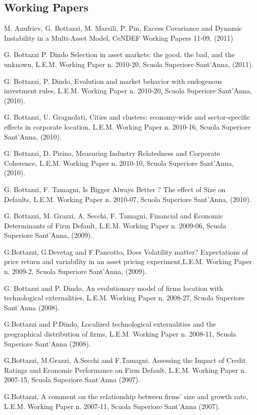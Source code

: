 \documentclass[a4paper]{article}
\begin{document}
\subsection{Working Papers%
  \label{working-papers}%
}

M. Anufriev, G. Bottazzi, M. Marsili, P. Pin, Excess Covariance and
Dynamic Instability in a Multi-Asset Model, CeNDEF Working Papers
11-09, (2011)

G. Bottazzi P. Dindo Selection in asset markets: the good, the bad,
and the unknown, L.E.M.  Working Paper n. 2010-20, Scuola Superiore
Sant'Anna, (2011).

G. Bottazzi, P. Dindo, Evolution and market behavior with endogenous
investment rules, L.E.M.  Working Paper n. 2010-20, Scuola Superiore
Sant'Anna, (2010).

G. Bottazzi, U. Gragnolati, Cities and clusters: economy-wide and
sector-specific effects in corporate location, L.E.M.  Working Paper
n. 2010-16, Scuola Superiore Sant'Anna, (2010).

G. Bottazzi, D. Pirino, Measuring Industry Relatedness and Corporate
Coherence, L.E.M.  Working Paper n. 2010-10, Scuola Superiore
Sant'Anna, (2010).

G. Bottazzi, F. Tamagni, Is Bigger Always Better ? The effect of Size
on Defaults, L.E.M.  Working Paper n. 2010-07, Scuola Superiore
Sant'Anna, (2010).

G. Bottazzi, M. Grazzi, A. Secchi, F. Tamagni, Financial and Economic
Determinants of Firm Default, L.E.M.  Working Paper n. 2009-06, Scuola
Superiore Sant'Anna, (2009).

G.Bottazzi, G.Devetag and F.Pancotto, Does Volatility matter?
Expectations of price return and variability in an asset pricing
experiment,L.E.M.  Working Paper n. 2009-2, Scuola Superiore Sant'Anna,
(2009).

G. Bottazzi and P. Dindo, An evolutionary model of firms location with
technological externalities, L.E.M.  Working Paper n. 2008-27, Scuola
Superiore Sant'Anna (2008).

G.Bottazzi and P.Dindo, Localized technological externalities and the
geographical distribution of firms, L.E.M. Working Paper n. 2008-11,
Scuola Superiore Sant'Anna (2008).

G.Bottazzi, M.Grazzi, A.Secchi and F.Tamagni, Assessing the Impact of
Credit Ratings and Economic Performance on Firm Default,
L.E.M. Working Paper n. 2007-15, Scuola Superiore Sant'Anna (2007).

G.Bottazzi, A comment on the relationship between firms' size and
growth rate, L.E.M. Working Paper n. 2007-11, Scuola Superiore
Sant'Anna (2007).
\end{document}
